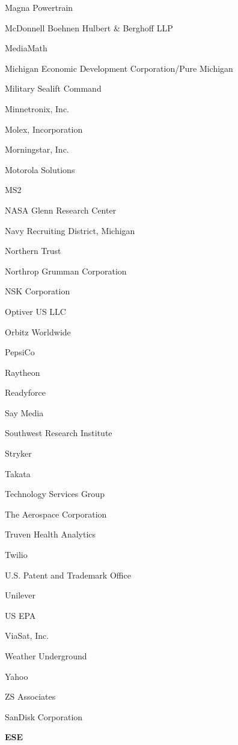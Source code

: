 \documentclass[twoside]{article}
\begin{document}
\begin{center}
\begin{multicols}{5}
\begin{FlushLeft}
\begin{compactitem}
\item Magna Powertrain
\item McDonnell Boehnen Hulbert \& Berghoff LLP
\item MediaMath
\item Michigan Economic Development Corporation/Pure Michigan
\item Military Sealift Command
\item Minnetronix, Inc.
\item Molex, Incorporation
\item Morningstar, Inc.
\item Motorola Solutions
\item MS2
\item NASA Glenn Research Center
\item Navy Recruiting District, Michigan
\item Northern Trust
\item Northrop Grumman Corporation
\item NSK Corporation
\item Optiver US LLC
\item Orbitz Worldwide
\item PepsiCo
\item Raytheon
\item Readyforce
\item Say Media
\item Southwest Research Institute
\item Stryker
\item Takata
\item Technology Services Group
\item The Aerospace Corporation
\item Truven Health Analytics
\item Twilio
\item U.S. Patent and Trademark Office
\item Unilever
\item US EPA
\item ViaSat, Inc.
\item Weather Underground
\item Yahoo
\item ZS Associates
\item SanDisk Corporation
\end{compactitem}
        \end{FlushLeft}
        \vspace{1em}
        {\fontsize{14}{16}\selectfont \bf ESE}\\
        \vspace{-1em}

\end{multicols}
\end{center}
\end{document}
